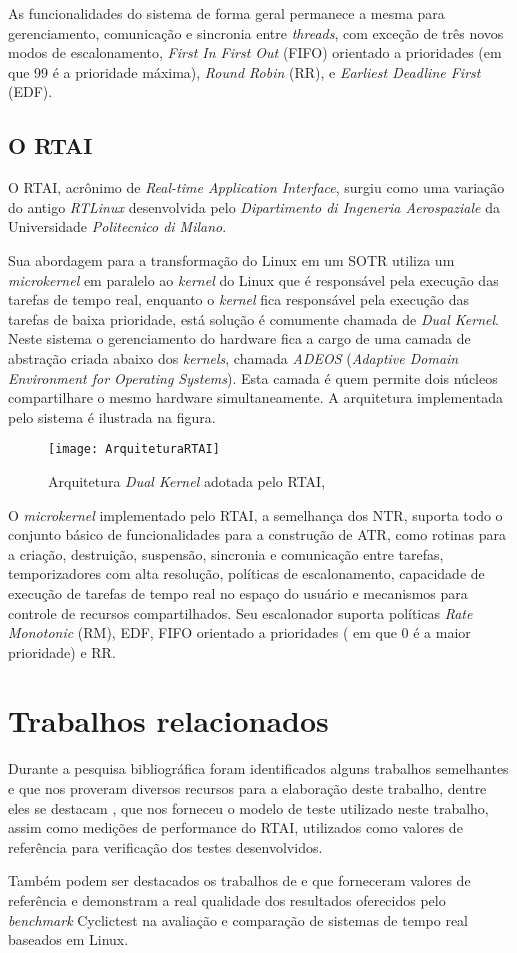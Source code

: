 As funcionalidades do sistema de forma geral permanece a mesma para gerenciamento, comunicação e sincronia entre \textit{threads}, com exceção de três novos modos de escalonamento, \textit{First In First Out} (FIFO) orientado a prioridades (em que 99 é a prioridade máxima), \textit{Round Robin} (RR), e \textit{Earliest Deadline First} (EDF).

\subsection{O RTAI}
O RTAI, acrônimo de \textit{Real-time Application Interface}, surgiu como uma variação do antigo \textit{RTLinux} desenvolvida pelo \textit{Dipartimento di Ingeneria Aerospaziale} da Universidade \textit{Politecnico di Milano}.

Sua abordagem para a transformação do Linux em um SOTR utiliza um \textit{microkernel} em paralelo ao \textit{kernel} do Linux que é responsável pela execução das tarefas de tempo real, enquanto o \textit{kernel} fica responsável pela execução das tarefas de baixa prioridade, está solução é comumente chamada de \textit{Dual Kernel}. Neste sistema o gerenciamento do hardware fica a cargo de uma camada de abstração criada abaixo dos \textit{kernels}, chamada \textit{ADEOS} (\textit{Adaptive Domain Environment for Operating Systems}). Esta camada é quem permite dois  núcleos compartilhare o mesmo hardware simultaneamente. A arquitetura implementada pelo sistema é ilustrada na figura.

\begin{figure}[!htb]
    \centering
    \texttt{[image: ArquiteturaRTAI]}
    \caption{Arquitetura \textit{Dual Kernel} adotada pelo RTAI, \cite{Litayem2011}}
    \label{TemposTarefa}
\end{figure}

O \textit{microkernel} implementado pelo RTAI, a semelhança dos NTR, suporta todo o conjunto básico de funcionalidades para a construção de ATR, como rotinas para a criação, destruição, suspensão, sincronia e comunicação entre tarefas, temporizadores com alta resolução, políticas de escalonamento, capacidade de execução de tarefas de tempo real no espaço do usuário e mecanismos para controle de recursos compartilhados. Seu escalonador suporta políticas \textit{Rate Monotonic} (RM), EDF, FIFO orientado a prioridades ( em que 0 é a maior prioridade) e RR.

\section{Trabalhos relacionados}
Durante a pesquisa bibliográfica foram identificados alguns trabalhos semelhantes e que nos proveram diversos recursos para a elaboração deste trabalho, dentre eles se destacam \cite{Anderson2007}, que nos forneceu o modelo de teste utilizado neste trabalho, assim como medições de performance do RTAI, utilizados como valores de referência para verificação dos testes desenvolvidos.

Também podem ser destacados os trabalhos de \cite{Litayem2011} e \cite{Hallberg2017} que forneceram valores de referência e demonstram a real qualidade dos resultados oferecidos pelo \textit{benchmark} Cyclictest na avaliação e comparação de sistemas de tempo real baseados em Linux.


